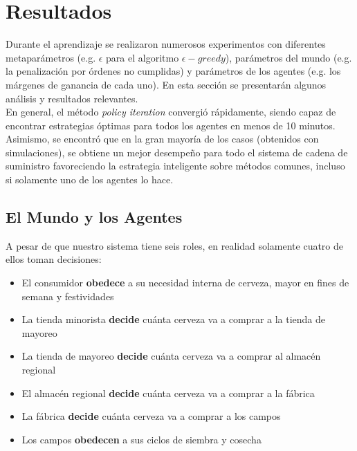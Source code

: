 \chapter{Resultados}


Durante el aprendizaje se realizaron numerosos experimentos con diferentes metapar\'ametros (e.g. $\epsilon$ para el algoritmo $\epsilon-greedy$), par\'ametros del mundo (e.g. la penalizaci\'on por \'ordenes no cumplidas) y par\'ametros de los agentes (e.g. los m\'argenes de ganancia de cada uno). En esta secci\'on se presentar\'an algunos an\'alisis y resultados relevantes.\\

En general, el m\'etodo \textit{policy iteration} convergi\'o r\'apidamente, siendo capaz de encontrar estrategias \'optimas para todos los agentes en menos de 10 minutos. Asimismo, se encontr\'o que en la gran mayor\'ia de los casos (obtenidos con simulaciones), se obtiene un mejor desempe\~no para todo el sistema de cadena de suministro favoreciendo la estrategia inteligente sobre m\'etodos comunes, incluso si solamente uno de los agentes lo hace.

\section{El Mundo y los Agentes}

A pesar de que nuestro sistema tiene seis roles, en realidad solamente cuatro de ellos toman decisiones:

\begin{itemize}
    \item El consumidor \textbf{obedece} a su necesidad interna de cerveza, mayor en fines de semana y festividades
    \item La tienda minorista \textbf{decide} cu\'anta cerveza va a comprar a la tienda de mayoreo
    \item La tienda de mayoreo \textbf{decide} cu\'anta cerveza va a comprar al almac\'en regional
    \item El almac\'en regional \textbf{decide} cu\'anta cerveza va a comprar a la f\'abrica
    \item La f\'abrica \textbf{decide} cu\'anta cerveza va a comprar a los campos
    \item Los campos \textbf{obedecen} a sus ciclos de siembra y cosecha
\end{itemize}

